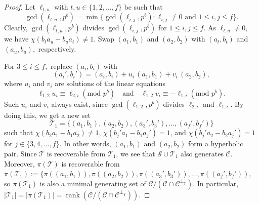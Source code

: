 \documentclass{article}
\DeclareMathOperator{\rank}{rank}
\theoremstyle{remark}
\theoremstyle{definition}
\numberwithin{equation}{section}
\begin{document}
\begin{proof}
Let $\ell_{t,u}$ with $t,u \in \{1,2, \ldots,f\}$ be such that
$$\gcd(\ell_{t,u},p^b)=\min\{\gcd(\ell_{i,j},p^b) : \ell_{i,j}\neq 0 \text{~and~} 1 \leq i,j \leq f \}.$$ 
Clearly, $\gcd(\ell_{t,u},p^b)$ divides $\gcd(\ell_{i,j},p^b)$ for $1 \leq i,j \leq f.$
 As $\ell_{t,u}\neq 0,$  we have  $\chi(b_ta_u-b_ua_t) \neq 1.$   Swap $(a_1,b_1)$ and $(a_2,b_2)$  with $(a_t,b_t)$ and $(a_u,b_u),$ respectively.

For $3 \leq i \leq f,$   replace $ (a_i,b_i)$ with 
 $$(a_i{'},b_i{'})=(a_i,b_i) +u_i \, (a_1,b_1) + v_i \, (a_2,b_2),$$ 
 where $u_i$ and $v_i$ are solutions of the linear equations 
$$\ell_{1,2}u_i\equiv\ell_{2,i}(\text{mod~}p^b) \ \ \ \text{ and } \ \ \ \ell_{1,2}v_i\equiv-\ell_{1,i}(\text{mod~}p^b).$$
Such $u_i$ and $v_i$ always exist, since $\gcd(\ell_{1,2},p^b)$ divides $\ell_{2,i}$ and $\ell_{1,i}$. By doing this, we get a new set 
$$\mathcal{T}_1 = \{(a_1,b_1),(a_2,b_2),(a_3{'},b_3{'}),\ldots,(a_f{'},b_f{'})\}$$
such that $\chi(b_2a_1-b_1a_2)\neq1$, $\chi(b_j{'}a_1-b_1a_j{'})=1$, and $\chi(b_j{'}a_2-b_2a_j{'})=1$  for $j \in \{3,4,\ldots,f\}$. In other words, $(a_1,b_1)$ and $(a_2,b_2)$ form a hyperbolic pair. Since $\mathcal{T}$ is recoverable from $\mathcal{T}_1$, we see that $\mathcal{S} \cup \mathcal{T}_1$ also generates $\mathcal{C}$. Moreover, $\pi(\mathcal{T})$ is recoverable from $\pi(\mathcal{T}_1) := \{\pi((a_1,b_1)),\pi((a_2,b_2)),\pi((a_3{'},b_3{'})),\ldots,\pi((a_f{'},b_f{'}))$, so $\pi(\mathcal{T}_1)$ is also a minimal generating set of $\mathcal{C}/(\mathcal{C} \cap \mathcal{C}^{\perp_\chi})$. In particular, $|\mathcal{T}_1| = |\pi(\mathcal{T}_1)| = \rank(\mathcal{C}/(\mathcal{C} \cap \mathcal{C}^{\perp_\chi}))$.


\end{proof}
\end{document}
